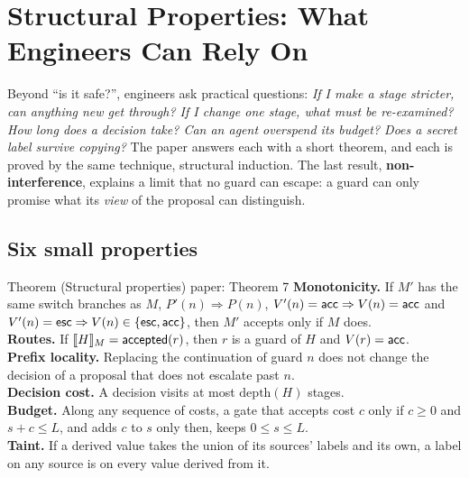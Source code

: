 \section{Structural Properties: What Engineers Can Rely On}
\label{ch:structural}

\begin{bigidea}
Beyond ``is it safe?'', engineers ask practical questions: \emph{If I make a stage stricter, can anything new get through? If I change one stage, what must be re-examined? How long does a decision take? Can an agent overspend its budget? Does a secret label survive copying?} The paper answers each with a short theorem, and each is proved by the same technique, structural induction. The last result, \textbf{non-interference}, explains a limit that no guard can escape: a guard can only promise what its \emph{view} of the proposal can distinguish.
\end{bigidea}

\subsection{Six small properties}

\begin{statement}{Theorem (Structural properties) \hfill\normalfont paper: Theorem 7}
\textbf{Monotonicity.} If $M'$ has the same switch branches as $M$, $P'(n)\Rightarrow P(n)$, $V'(n)=\mathsf{acc}\Rightarrow V(n)=\mathsf{acc}$ and $V'(n)=\mathsf{esc}\Rightarrow V(n)\in\{\mathsf{esc},\mathsf{acc}\}$, then $M'$ accepts only if $M$ does.\\
\textbf{Routes.} If $\llbracket H\rrbracket_{M}=\mathsf{accepted}(r)$, then $r$ is a guard of $H$ and $V(r)=\mathsf{acc}$.\\
\textbf{Prefix locality.} Replacing the continuation of guard $n$ does not change the decision of a proposal that does not escalate past $n$.\\
\textbf{Decision cost.} A decision visits at most $\mathrm{depth}(H)$ stages.\\
\textbf{Budget.} Along any sequence of costs, a gate that accepts cost $c$ only if $c\ge0$ and $s+c\le L$, and adds $c$ to $s$ only then, keeps $0\le s\le L$.\\
\textbf{Taint.} If a derived value takes the union of its sources' labels and its own, a label on any source is on every value derived from it.
\end{statement}

